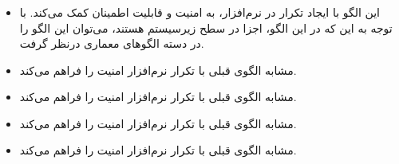 \subsubsection{}
\begin{itemize}
\item {} %
این الگو با ایجاد تکرار در نرم‌افزار، به امنیت و قابلیت اطمینان کمک می‌کند.
با توجه به این که در این الگو، اجزا در سطح زیرسیستم هستند،
می‌توان این الگو را در دسته الگوهای معماری درنظر گرفت.
\item {} %
مشابه الگوی قبلی با تکرار نرم‌افزار امنیت را فراهم می‌کند.
\item {} %
مشابه الگوی قبلی با تکرار نرم‌افزار امنیت را فراهم می‌کند.
\item {} %
مشابه الگوی قبلی با تکرار نرم‌افزار امنیت را فراهم می‌کند.
\item {} %
مشابه الگوی قبلی با تکرار نرم‌افزار امنیت را فراهم می‌کند.
\end{itemize}